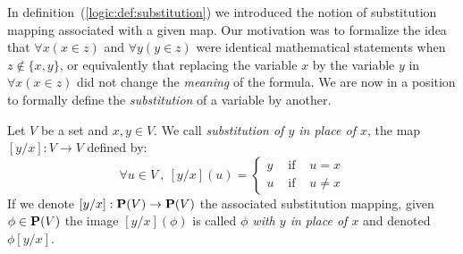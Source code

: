 In definition~(\ref{logic:def:substitution}) we introduced the
notion of substitution mapping associated with a given map. Our
motivation was to formalize the idea that $\forall x(x\in z)$ and
$\forall y(y\in z)$ were identical mathematical statements when
$z\not\in\{x,y\}$, or equivalently that replacing the variable $x$
by the variable $y$ in $\forall x(x\in z)$ did not change the {\em
meaning} of the formula. We are now in a position to formally define
the {\em substitution} of a variable by another.
\begin{defin}\label{logic:def:single:var:substitution}
Let $V$ be a set and $x,y\in V$. We call {\em substitution of $y$ in
place of $x$}, the map $[y/x]:V\to V$ defined by:
    \[
    \forall u\in V\ ,\ [y/x](u)=\left\{
    \begin{array}{lcl}
    y&\mbox{\ if\ }&u=x\\
    u&\mbox{\ if\ }&u\neq x
    \end{array}
    \right.
    \]
If we denote $[y/x]:\mbox{${\bf P}(V)$}\to\mbox{${\bf P}(V)$}$ the associated substitution mapping,
given $\phi\in\mbox{${\bf P}(V)$}$ the image $[y/x](\phi)$ is called {\em $\phi$
with $y$ in place of $x$} and denoted $\phi[y/x]$.
\end{defin}

